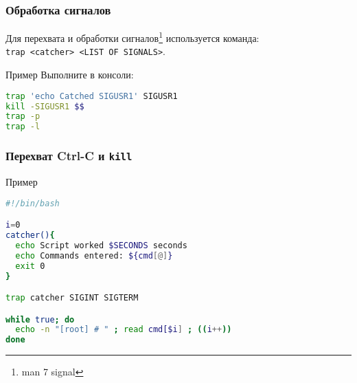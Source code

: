 \begin{frame}[fragile]
	\frametitle{Обработка сигналов}
	
	Для перехвата и обработки сигналов\footnote{man 7 signal} используется команда:\\
	{\tt trap <catcher> <LIST OF SIGNALS>}.

	\begin{block}{Пример}
		Выполните в консоли:
			\begin{lstlisting}[language=sh]
trap 'echo Catched SIGUSR1' SIGUSR1
kill -SIGUSR1 $$
trap -p
trap -l
			\end{lstlisting}
	\end{block}
\end{frame}

\begin{frame}[fragile]
	\frametitle{Перехват Ctrl-C и {\tt kill}}
	
	\begin{block}{Пример}
		\begin{lstlisting}[language=sh]
#!/bin/bash

i=0
catcher(){
  echo Script worked $SECONDS seconds
  echo Commands entered: ${cmd[@]}
  exit 0
}

trap catcher SIGINT SIGTERM

while true; do
  echo -n "[root] # " ; read cmd[$i] ; ((i++))
done
		\end{lstlisting}
	\end{block}
\end{frame}



